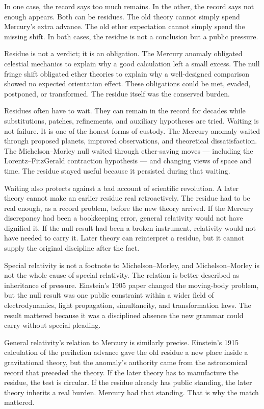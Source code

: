 In one case, the record says too much remains. In the other, the record
says not enough appears. Both can be residues. The old theory cannot
simply spend Mercury's extra advance. The old ether expectation cannot
simply spend the missing shift. In both cases, the residue is not a
conclusion but a public pressure.

Residue is not a verdict; it is an obligation. The Mercury anomaly
obligated celestial mechanics to explain why a good calculation left a
small excess. The null fringe shift obligated ether theories to explain
why a well-designed comparison showed no expected orientation effect. These obligations could be met, evaded, postponed, or transformed.
The residue itself was the conserved burden.

Residues often have to wait. They can remain in the record for decades
while substitutions, patches, refinements, and auxiliary hypotheses are
tried. Waiting is not failure. It is one of the honest forms of custody.
The Mercury anomaly waited through proposed planets, improved
observations, and theoretical dissatisfaction. The Michelson--Morley null
waited through ether-saving moves --- including the Lorentz--FitzGerald
contraction hypothesis --- and changing views of space and time. The
residue stayed useful because it persisted during that waiting.

Waiting also protects against a bad account of scientific revolution.
A later theory cannot make an earlier residue real retroactively. The
residue had to be real enough, as a record problem, before the new theory
arrived. If the Mercury discrepancy had been a bookkeeping error, general
relativity would not have dignified it. If the null result had been a
broken instrument, relativity would not have needed to carry it. Later
theory can reinterpret a residue, but it cannot supply the original
discipline after the fact.

Special relativity is not a footnote to Michelson--Morley, and
Michelson--Morley is not the whole cause of special relativity. The
relation is better described as inheritance of pressure. Einstein's 1905
paper changed the moving-body problem, but the null result was one public
constraint within a wider field of electrodynamics, light propagation,
simultaneity, and transformation laws. The result mattered because it was
a disciplined absence the new grammar could carry without special
pleading.

General relativity's relation to Mercury is similarly precise. Einstein's
1915 calculation of the perihelion advance gave the old residue a new
place inside a gravitational theory, but the anomaly's authority came
from the astronomical record that preceded the theory. If the later
theory has to manufacture the residue, the test is circular. If the
residue already has public standing, the later theory inherits a real
burden. Mercury had that standing. That is why the match mattered.

